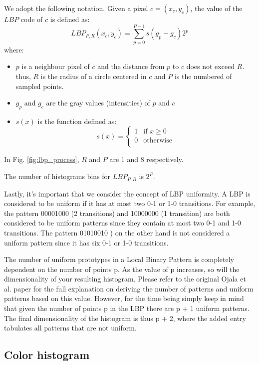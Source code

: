 We adopt the following notation. Given a pixel $c = (x_c, y_c)$, the value of the $LBP$ code of $c$ is defined as:
$$LBP_{P, R} (x_c, y_c) = \sum_{p = 0}^{P - 1} s (g_p - g_c) 2^p$$
where:
\begin{itemize}
    \item $p$ is a neighbour pixel of $c$ and the distance from $p$ to $c$ does not exceed $R$. thus, $R$ is the radius of a circle centered in $c$ and $P$ is the numbered of sampled points.
    \item $g_p$ and $g_c$ are the gray values (intensities) of $p$ and $c$
    \item $s(x)$ is the function defined as:
    \begin{equation}
    s(x) =
    \begin{cases}
    1 & \text{if $x \geq 0$}\\
    0 & \text{otherwise} \\
    \end{cases}
    \end{equation}
\end{itemize}

In Fig. \ref{fig:lbp_process}, $R$ and $P$ are 1 and 8 respectively.

The number of histograms bins for $LBP_{P, R}$ is $2^P$.

Lastly, it’s important that we consider the concept of LBP uniformity. A LBP is considered to be uniform if it has at most two 0-1 or 1-0 transitions. For example, the pattern 00001000  (2 transitions) and 10000000  (1 transition) are both considered to be uniform patterns since they contain at most two 0-1 and 1-0 transitions. The pattern 01010010 ) on the other hand is not considered a uniform pattern since it has six 0-1 or 1-0 transitions.

The number of uniform prototypes in a Local Binary Pattern is completely dependent on the number of points p. As the value of p increases, so will the dimensionality of your resulting histogram. Please refer to the original Ojala et al. paper for the full explanation on deriving the number of patterns and uniform patterns based on this value. However, for the time being simply keep in mind that given the number of points p in the LBP there are p + 1 uniform patterns. The final dimensionality of the histogram is thus p + 2, where the added entry tabulates all patterns that are not uniform.

\subsection{Color histogram}

